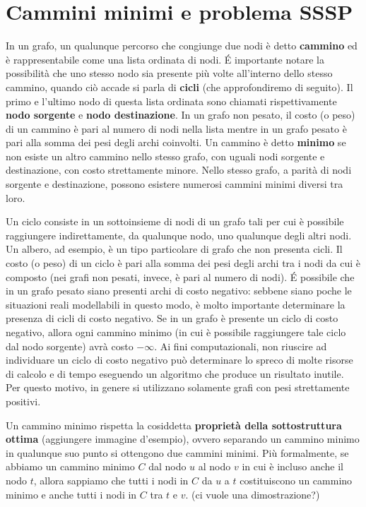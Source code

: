 \documentclass[12pt,a4paper]{book}
\begin{document}
	\section{Cammini minimi e problema SSSP}
	\label{section:sssp}
	In un grafo, un qualunque percorso che congiunge due nodi è detto \textbf{cammino} ed è rappresentabile come una lista ordinata di nodi. \'E importante notare la possibilità che uno stesso nodo sia presente più volte all'interno dello stesso cammino, quando ciò accade si parla di \textbf{cicli} (che approfondiremo di seguito). Il primo e l'ultimo nodo di questa lista ordinata sono chiamati rispettivamente \textbf{nodo sorgente} e \textbf{nodo destinazione}. In un grafo non pesato, il costo (o peso) di un cammino è pari al numero di nodi nella lista mentre in un grafo pesato è pari alla somma dei pesi degli archi coinvolti. Un cammino è detto \textbf{minimo} se non esiste un altro cammino nello stesso grafo, con uguali nodi sorgente e destinazione, con costo strettamente minore. Nello stesso grafo, a parità di nodi sorgente e destinazione, possono esistere numerosi cammini minimi diversi tra loro.
	
	Un ciclo consiste in un sottoinsieme di nodi di un grafo tali per cui è possibile raggiungere indirettamente, da qualunque nodo, uno qualunque degli altri nodi. Un albero, ad esempio, è un tipo particolare di grafo che non presenta cicli. Il costo (o peso) di un ciclo è pari alla somma dei pesi degli archi tra i nodi da cui è composto (nei grafi non pesati, invece, è pari al numero di nodi). \'E possibile che in un grafo pesato siano presenti archi di costo negativo: sebbene siano poche le situazioni reali modellabili in questo modo, è molto importante determinare la presenza di cicli di costo negativo. Se in un grafo è presente un ciclo di costo negativo, allora ogni cammino minimo (in cui è possibile raggiungere tale ciclo dal nodo sorgente) avrà costo $-\infty$. Ai fini computazionali, non riuscire ad individuare un ciclo di costo negativo può determinare lo spreco di molte risorse di calcolo e di tempo eseguendo un algoritmo che produce un risultato inutile. Per questo motivo, in genere si utilizzano solamente grafi con pesi strettamente positivi.
	
	Un cammino minimo rispetta la cosiddetta \textbf{proprietà della sottostruttura ottima} (aggiungere immagine d'esempio), ovvero separando un cammino minimo in qualunque suo punto si ottengono due cammini minimi. Più formalmente, se abbiamo un cammino minimo $C$ dal nodo $u$ al nodo $v$ in cui è incluso anche il nodo $t$, allora sappiamo che tutti i nodi in $C$ da $u$ a $t$ costituiscono un cammino minimo e anche tutti i nodi in $C$ tra $t$ e $v$. (ci vuole una dimostrazione?)
	
\end{document}
